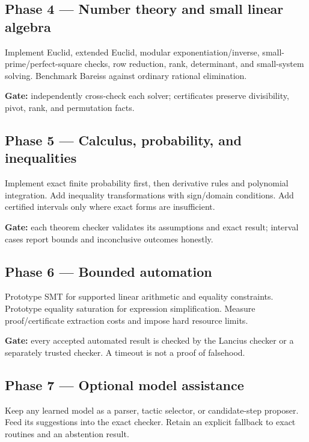 \documentclass[
  10pt,
]{article}
\begin{document}
\subsection{Phase 4 --- Number theory and small linear
algebra}\label{phase-4-number-theory-and-small-linear-algebra}

Implement Euclid, extended Euclid, modular exponentiation/inverse,
small-prime/perfect-square checks, row reduction, rank, determinant, and
small-system solving. Benchmark Bareiss against ordinary rational
elimination.

\textbf{Gate:} independently cross-check each solver; certificates
preserve divisibility, pivot, rank, and permutation facts.

\subsection{Phase 5 --- Calculus, probability, and
inequalities}\label{phase-5-calculus-probability-and-inequalities}

Implement exact finite probability first, then derivative rules and
polynomial integration. Add inequality transformations with sign/domain
conditions. Add certified intervals only where exact forms are
insufficient.

\textbf{Gate:} each theorem checker validates its assumptions and exact
result; interval cases report bounds and inconclusive outcomes honestly.

\subsection{Phase 6 --- Bounded
automation}\label{phase-6-bounded-automation}

Prototype SMT for supported linear arithmetic and equality constraints.
Prototype equality saturation for expression simplification. Measure
proof/certificate extraction costs and impose hard resource limits.

\textbf{Gate:} every accepted automated result is checked by the Lancius
checker or a separately trusted checker. A timeout is not a proof of
falsehood.

\subsection{Phase 7 --- Optional model
assistance}\label{phase-7-optional-model-assistance}

Keep any learned model as a parser, tactic selector, or candidate-step
proposer. Feed its suggestions into the exact checker. Retain an
explicit fallback to exact routines and an abstention result.
\end{document}

